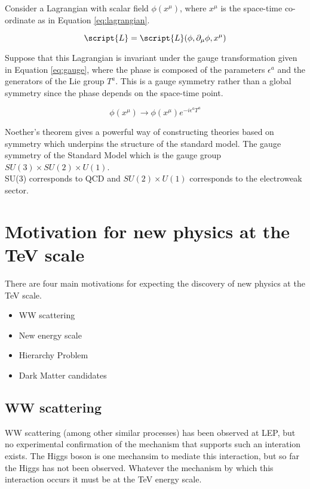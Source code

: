 Consider a Lagrangian with scalar field $\phi(x^{\mu})$, where $x^{\mu}$ is the
space-time co-ordinate as in Equation \ref{eq:lagrangian}.

\begin{equation}
\script{L} = \script{L}(\phi, \partial_{\mu}\phi, x^{\mu})
\label{eq:lagrangian}
\end{equation}

Suppose that this Lagrangian is invariant under the gauge transformation given
in Equation \ref{eq:gauge}, where the phase is composed of the parameters 
$\epsilon^{a}$ and the generators of the Lie group $T^{a}$. This is a gauge
symmetry rather than a global symmetry since the phase depends on the space-time
point. 

\begin{equation} 
\phi(x^{\mu})\rightarrow \phi(x^{\mu})e^{-i\epsilon^{a}T^{a}}
\label{eq:gauge}
\end{equation}

Noether's theorem gives a powerful way of constructing theories based on 
symmetry which underpins the structure of the standard model. The gauge
symmetry of the Standard Model which is the gauge group $SU(3)\times 
SU(2)\times U(1)$. \\

SU(3) corresponds to QCD and $SU(2)\times U(1)$ corresponds to the electroweak
sector. \\



\section{Motivation for new physics at the TeV scale}

There are four main motivations for expecting the discovery of new physics at 
the TeV scale.

\begin{itemize}
\item WW scattering
\item New energy scale
\item Hierarchy Problem
\item Dark Matter candidates
\end{itemize}

\subsection{WW scattering}

WW scattering (among other similar processes) has been observed at LEP, but
no experimental confirmation of the mechanism that supports such an interation
exists. The Higgs boson is one mechansim to mediate this interaction, but so far
the Higgs has not been observed. Whatever the mechanism by which this
interaction occurs it must be at the TeV energy scale. \\


